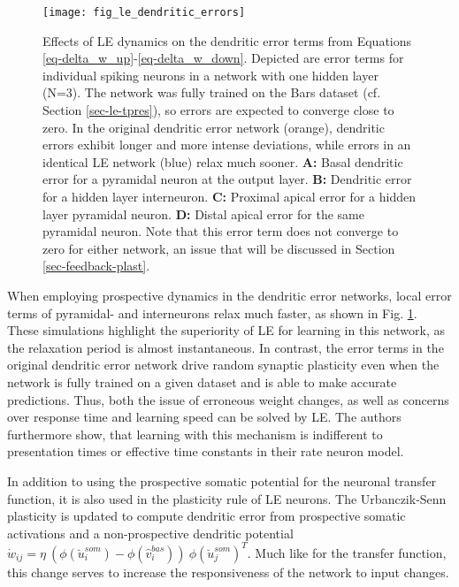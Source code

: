 \begin{figure}[h!]
  \centering
  \texttt{[image: fig\_le\_dendritic\_errors]}
  \caption[Effects of LE dynamics on dendritic error]{Effects of LE dynamics on the dendritic error terms from Equations
    \ref{eq-delta_w_up}-\ref{eq-delta_w_down}. Depicted are error terms for individual spiking neurons in a network with
    one hidden layer (N=3). The network was fully trained on the Bars dataset (cf. Section \ref{sec-le-tpres}), so
    errors are expected to converge close to zero. In the original dendritic error network (orange), dendritic errors
    exhibit longer and more intense deviations, while errors in an identical LE network (blue) relax much sooner.
    \textbf{A:} Basal dendritic error for a pyramidal neuron at the output layer. \textbf{B:} Dendritic error for a
    hidden layer interneuron. \textbf{C:} Proximal apical error for a hidden layer pyramidal neuron. \textbf{D:} Distal
    apical error for the same pyramidal neuron. Note that this error term does not converge to zero for either network,
    an issue that will be discussed in Section \ref{sec-feedback-plast}.}
  \label{fig-error-comp-le}
\end{figure}


When employing prospective dynamics in the dendritic error networks, local error terms of pyramidal- and interneurons
relax much faster, as shown in Fig. \ref{fig-error-comp-le}. These simulations highlight the superiority of LE for
learning in this network, as the relaxation period is almost instantaneous. In contrast, the error terms in the original
dendritic error network drive random synaptic plasticity even when the network is fully trained on a given dataset and
is able to make accurate predictions. Thus, both the issue of erroneous weight changes, as well as concerns over
response time and learning speed can be solved by LE. The authors furthermore show, that learning with this mechanism is
indifferent to presentation times or effective time constants in their rate neuron model.

In addition to using the prospective somatic potential for the neuronal transfer function, it is also used in the
plasticity rule of LE neurons. The Urbanczik-Senn plasticity is updated to compute dendritic error from
prospective somatic activations and a non-prospective dendritic potential $\dot{w}_{ij}= \eta \ (
\phi(\breve{u}_i^{som}) - \phi(\hat{v}_i^{bas}) ) \ \phi(\breve{u}_j^{som})^T$. Much like for the transfer function,
this change serves to increase the responsiveness of the network to input changes.

